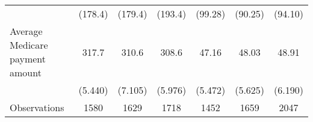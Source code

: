 \begin{adjustbox}{max
width={\textwidth},caption={Summary Statistics, Lucentis and Avastin\label{table:lucentisavastinsum}},nofloat=table}
\begin{tabular}{l*{6}{c}}
                    &     (178.4)         &     (179.4)         &     (193.4)         &     (99.28)         &     (90.25)         &     (94.10)         \\
\addlinespace
Average Medicare payment amount&       317.7         &       310.6         &       308.6         &       47.16         &       48.03         &       48.91         \\
                    &     (5.440)         &     (7.105)         &     (5.976)         &     (5.472)         &     (5.625)         &     (6.190)         \\
\midrule
Observations        &        1580         &        1629         &        1718         &        1452         &        1659         &        2047         \\
\bottomrule
\end{tabular}\end{adjustbox}

